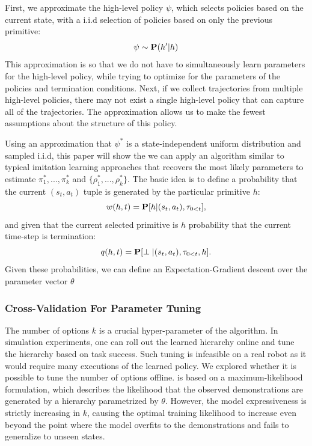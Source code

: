 
First, we approximate the high-level policy $\psi$, which selects policies based on the current state, with a i.i.d selection of policies based on only the previous primitive:
\[
\psi \sim \mathbf{P}(h' \vert h)
\]
This approximation is so that we do not have to simultaneously learn parameters for the high-level policy, while trying to optimize for the parameters of the policies and termination conditions.
Next, if we collect trajectories from multiple high-level policies, there may not exist a single high-level policy that can capture all of the trajectories.
The approximation allows us to make the fewest assumptions about the structure of this policy.

Using an approximation that $\psi^*$ is a state-independent uniform distribution and sampled i.i.d, this paper will show the we can apply an algorithm similar to typical imitation learning approaches that recovers the most likely parameters to estimate $\pi^*_{1},...,\pi^*_{k}$ and $\{\rho^*_{1},...,\rho^*_{k}\}$. The basic idea is to define a probability that the current $(s_t,a_t)$ tuple is generated by the particular primitive $h$:
\[
w(h,t) = \mathbf{P}[h \vert (s_t, a_t), \tau_{0<t}],
\]
and given that the current selected primitive is $h$ probability that the current time-step is termination:
\[
q(h,t) = \mathbf{P}[\perp \vert (s_t, a_t), \tau_{0<t}, h].
\]
Given these probabilities, we can define an Expectation-Gradient descent over the parameter vector $\theta$

\subsubsection{Cross-Validation For Parameter Tuning}
The number of options $k$ is a crucial hyper-parameter of the algorithm.
In simulation experiments, one can roll out the learned hierarchy online and tune the hierarchy based on task success.
Such tuning is infeasible on a real robot as it would require many executions of the learned policy.
We explored whether it is possible to tune the number of options offline.
\alg is based on a maximum-likelihood formulation, which describes the likelihood that the observed demonstrations are generated by a hierarchy parametrized by $\theta$.
However, the model expressiveness is strictly increasing in $k$, causing the optimal training likelihood to increase even beyond the point where the model overfits to the demonstrations and fails to generalize to unseen states.

